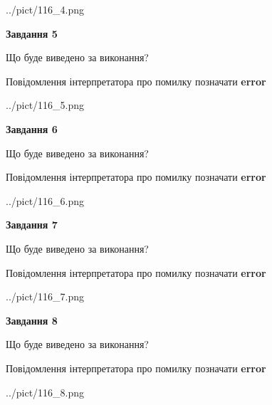 \documentclass[12pt, ukrainian]{article}
\begin{document}
{\begin{center}
	{../pict/116_4.png}
\end{center}
\newpage

{\begin {center}\textbf{Завдання 5}\end {center}}\par
Що буде виведено за виконання? \par
Повідомлення інтерпретатора про помилку позначати \textbf{error}

\begin{center}
	{../pict/116_5.png}
\end{center}
\newpage

{\begin {center}\textbf{Завдання 6}\end {center}}\par
Що буде виведено за виконання? \par
Повідомлення інтерпретатора про помилку позначати \textbf{error}

\begin{center}
	{../pict/116_6.png}
\end{center}
\newpage

{\begin {center}\textbf{Завдання 7}\end {center}}\par
Що буде виведено за виконання? \par
Повідомлення інтерпретатора про помилку позначати \textbf{error}

\begin{center}
	{../pict/116_7.png}
\end{center}
\newpage

{\begin {center}\textbf{Завдання 8}\end {center}}\par
Що буде виведено за виконання? \par
Повідомлення інтерпретатора про помилку позначати \textbf{error}

\begin{center}
	{../pict/116_8.png}
\end{center}
\newpage

}
\end{document}
